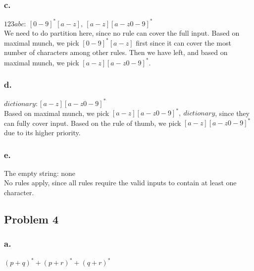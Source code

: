 \documentclass{article}
\begin{document}
	\subsubsection*{c.}
	$123abc: \  [0-9]^*[a-z],\ [a-z][a-z 0-9]^*$\\
	We need to do partition here, since no rule can cover the full input. Based on maximal munch, we pick $[0-9]^*[a-z]$ first since it can cover the most number of characters  among other rules. Then we have  left, and based on maximal munch, we pick $[a-z][a-z 0-9]^*$.
	
	\subsubsection*{d.}
	$dictionary: [a-z][a-z 0-9]^*$\\
	Based on maximal munch, we pick $[a-z][a-z 0-9]^*,\ dictionary$, since they can fully cover input. Based on the rule of thumb, we pick $[a-z][a-z 0-9]^*$ due to its higher priority.
	
	\subsubsection*{e.}
	The empty string: none\\
	No rules apply, since all rules require the valid inputs to contain at least one character.
	
	\subsection*{Problem 4}
	\subsubsection*{a.}
	$ (p+q)^*+(p+r)^*+(q+r)^*$
	
\end{document}
